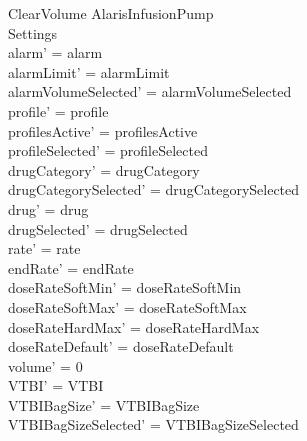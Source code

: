 \begin{schema}{ClearVolume}
	\Delta AlarisInfusionPump\\
	Settings\\
	\where
	alarm' = alarm\\
	alarmLimit' = alarmLimit\\
	\pagebreak
	alarmVolumeSelected' = alarmVolumeSelected\\
	profile' = profile\\
	profilesActive' = profilesActive\\  
	  profileSelected' = profileSelected\\
	drugCategory' = drugCategory\\ drugCategorySelected' = drugCategorySelected\\
	drug' = drug\\ drugSelected' = drugSelected\\
	rate' = rate\\
	endRate' = endRate\\
	doseRateSoftMin' = doseRateSoftMin\\
	doseRateSoftMax' = doseRateSoftMax\\
	doseRateHardMax' = doseRateHardMax\\
	doseRateDefault' = doseRateDefault\\
	volume' = 0\\
	VTBI' = VTBI\\
	VTBIBagSize' = VTBIBagSize\\ VTBIBagSizeSelected' = VTBIBagSizeSelected\\

\end{schema}
